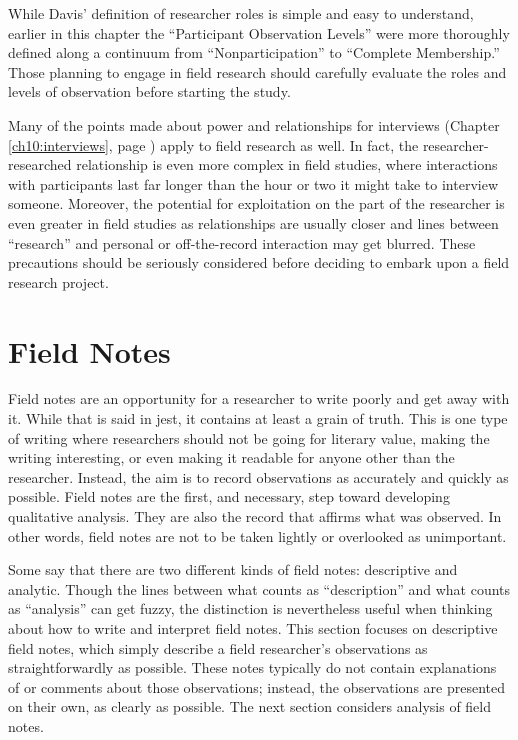 While Davis' definition of researcher roles is simple and easy to understand, earlier in this chapter the ``Participant Observation Levels'' were more thoroughly defined along a continuum from ``Nonparticipation'' to ``Complete Membership.'' Those planning to engage in field research should carefully evaluate the roles and levels of observation before starting the study.

Many of the points made about power and relationships for interviews (Chapter \ref{ch10:interviews}, page \pageref{ch10:interviews}) apply to field research as well. In fact, the researcher-researched relationship is even more complex in field studies, where interactions with participants last far longer than the hour or two it might take to interview someone. Moreover, the potential for exploitation on the part of the researcher is even greater in field studies as relationships are usually closer and lines between ``research'' and personal or off-the-record interaction may get blurred. These precautions should be seriously considered before deciding to embark upon a field research project.

\section{Field Notes}

Field notes are an opportunity for a researcher to write poorly and get away with it. While that is said in jest, it contains at least a grain of truth. This is one type of writing where researchers should not be going for literary value, making the writing interesting, or even making it readable for anyone other than the researcher. Instead, the aim is to record observations as accurately and quickly as possible. Field notes are the first, and necessary, step toward developing qualitative analysis. They are also the record that affirms what was observed. In other words, field notes are not to be taken lightly or overlooked as unimportant.

Some say that there are two different kinds of field notes: descriptive and analytic. Though the lines between what counts as ``description'' and what counts as ``analysis'' can get fuzzy, the distinction is nevertheless useful when thinking about how to write and interpret field notes. This section focuses on descriptive field notes, which simply describe a field researcher's observations as straightforwardly as possible. These notes typically do not contain explanations of or comments about those observations; instead, the observations are presented on their own, as clearly as possible. The next section considers analysis of field notes.


